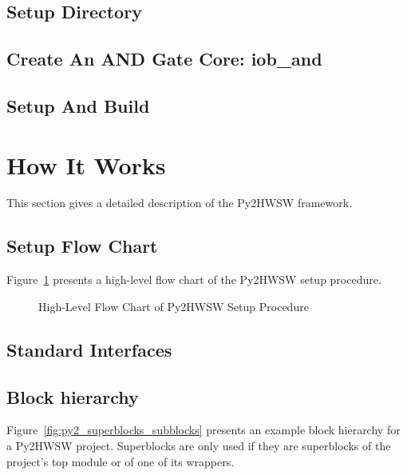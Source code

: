 \documentclass{ug}
\begin{document}
\subsection{Setup Directory}
\label{sec:setup_dir}


\subsection{Create An AND Gate Core: iob\_and}
\label{sec:iob_and}


\subsection{Setup And Build}
\label{sec:setup_build}


%
%
\ifdefined\SECTIONCLEARPAGE
\clearpage
\fi
\section{How It Works}
\label{sec:how_it_works}

This section gives a detailed description of the Py2HWSW framework.

\subsection{Setup Flow Chart}
\label{sec:py2_flow_chart}

Figure~\ref{fig:py2_flow_chart} presents a high-level flow chart of the Py2HWSW setup procedure.

\begin{figure}[H]
  \vspace{-0.7cm}
  \caption{High-Level Flow Chart of Py2HWSW Setup Procedure}
  \label{fig:py2_flow_chart}
\end{figure}

\subsection{Standard Interfaces}
\label{sec:py2_standard_interfaces}


\subsection{Block hierarchy}
\label{sec:py2_block_hierarchy}

Figure~\ref{fig:py2_superblocks_subblocks} presents an example block hierarchy for a Py2HWSW project.
Superblocks are only used if they are superblocks of the project's top module or of one of its wrappers.
\end{document}
